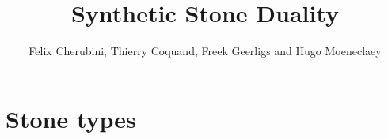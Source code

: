 \documentclass{../util/zariski}
\title{Synthetic Stone Duality}
\begin{document}
\author{Felix Cherubini, Thierry Coquand, Freek Geerligs and Hugo Moeneclaey}

\maketitle

%

\tableofcontents




%

\section{Stone types}

\end{document}
